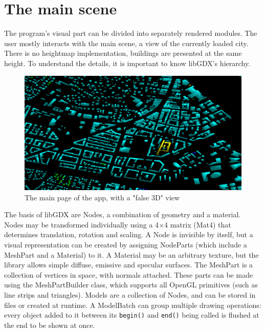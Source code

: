 \section{The main scene}
The program's visual part can be divided into separately rendered modules. The user mostly interacts with the main scene, a view of the currently loaded city. There is no heightmap implementation, buildings are presented at the same height. To understand the details, it is important to know libGDX's hierarchy.\cite{LibgdxModels}

\begin{figure}[!ht]
    \centering
    \includegraphics[width=150mm, keepaspectratio]{images/main_graphics_view.png}
    \caption{The main page of the app, with a "false 3D" view}
\end{figure}

The basis of libGDX are Nodes, a combination of geometry and a material. Nodes may be transformed individually using a 4$\times$4 matrix (Mat4) that determines translation, rotation and scaling. A Node is invisible by itself, but a visual representation can be created by assigning NodeParts (which include a MeshPart and a Material) to it. A Material may be an arbitrary texture, but the library allows simple diffuse, emissive and specular surfaces. The MeshPart is a collection of vertices in space, with normals attached. These parts can be made using the MeshPartBuilder class, which supports all OpenGL primitives (such as line strips and triangles). Models are a collection of Nodes, and can be stored in files or created at runtime. A ModelBatch can group multiple drawing operations: every object added to it between its \verb|begin()| and \verb|end()| being called is flushed at the end to be shown at once.


